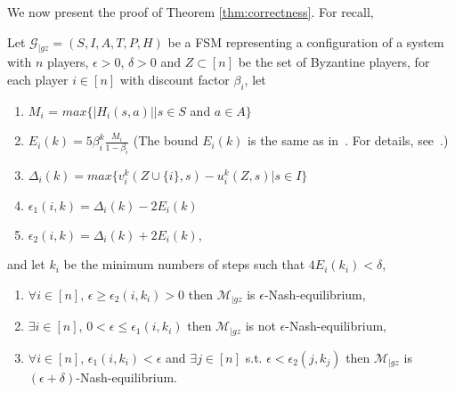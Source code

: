 We now present the proof of Theorem \ref{thm:correctness}. For recall,
\begin{theorem}
	\label{thm:correctness}
	Let $\mathcal{G}_{|gz}=(S, I, A, T, P, H)$ be a FSM representing a configuration of a system with $n$ players, $ \epsilon > 0$, $\delta > 0$ and $Z \subset [n]$ be the set of Byzantine players, for each player $i \in [n]$ with discount factor $\beta_i$, let 
	\begin{enumerate}
		\item $M_i$ = $max \{|H_i(s,a)| | s \in S$ and $a \in A\}$
		\item $E_i(k) = 5\beta_i^{k} \frac{M_i}{1-\beta_i}$ (The bound $E_i(k)$ is the same as in~\cite{FDJD16}. For details, see~\cite{techreport}.)
		\item $\Delta_i(k)=max\{v_i^{k}(Z \cup \{i\},s)- u_i^{k}(Z,s)|s\in I \}$
		\item $\epsilon_1(i,k) = \Delta_i(k) - 2E_i(k)$
		\item $\epsilon_2(i,k) = \Delta_i(k) + 2E_i(k)$,
	\end{enumerate}
	and let $k_i$ be the minimum numbers of steps such that $4E_i(k_i) < \delta$,
	\begin{enumerate}
		\item {} $\forall i \in [n]$, $\epsilon \ge \epsilon_2(i,k_i) > 0$ then $\mathcal{M}_{|gz}$ is $\epsilon$-Nash-equilibrium,
		\item {} $\exists i \in [n]$, $0 < \epsilon \le \epsilon_1(i,k_i)$ then $\mathcal{M}_{|gz}$ is not $\epsilon$-Nash-equilibrium,
		\item {} $\forall i \in [n]$, $\epsilon_1(i,k_i) < \epsilon$ and $\exists j \in [n]$ s.t. $\epsilon < \epsilon_2(j,k_j)$ then $\mathcal{M}_{|gz}$ is $(\epsilon + \delta)$-Nash-equilibrium.
	\end{enumerate}
\end{theorem}

